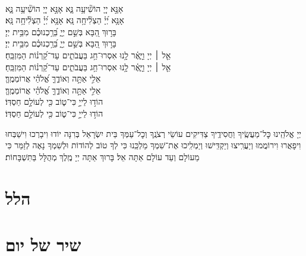 \documentclass[twoside, openany, parskip=half, 11pt]{book}
\begin{document}
{\\
אָנָּ֣א יְיָ֭ הוֹשִׁ֘יעָ֥ה נָּ֑א \hfill אָנָּ֣א יְיָ֭ הוֹשִׁ֘יעָ֥ה נָּ֑א\\
אָנָּ֥א יְ֝יָ֗ הַצְלִ֘יחָ֥ה נָּֽא׃ \hfill אָנָּ֥א יְ֝יָ֗ הַצְלִ֘יחָ֥ה נָּֽא׃\\
בָּר֣וּךְ הַ֭בָּא בְּשֵׁ֣ם יְיָ֑ בֵּ֝רַ֥כְנוּכֶ֗ם מִבֵּ֥ית יְיָ׃\\
\scriptsize{בָּר֣וּךְ הַ֭בָּא בְּשֵׁ֣ם יְיָ֑ בֵּ֝רַ֥כְנוּכֶ֗ם מִבֵּ֥ית יְיָ׃}\\
\normalsize{אֵ֤ל ׀ יְיָ וַיָּ֢אֶ֫ר לָ֥נוּ אִסְרוּ־חַ֥ג בַּעֲבֹתִ֑ים עַד־קַ֝רְנ֗וֹת הַמִּזְבֵּֽחַ׃}\\
\scriptsize{אֵ֤ל ׀ יְיָ וַיָּ֢אֶ֫ר לָ֥נוּ אִסְרוּ־חַ֥ג בַּעֲבֹתִ֑ים עַד־קַ֝רְנ֗וֹת הַמִּזְבֵּֽחַ׃}\\
\normalsize{אֵלִ֣י אַתָּ֣ה וְאוֹדֶ֑ךָּ אֱ֝לֹהַ֗י אֲרוֹמְמֶֽךָּ׃}\\
\scriptsize{אֵלִ֣י אַתָּ֣ה וְאוֹדֶ֑ךָּ אֱ֝לֹהַ֗י אֲרוֹמְמֶֽךָּ׃}\\
\normalsize{הוֹד֣וּ לַייָ֣ כִּי־ט֑וֹב כִּ֖י לְעוֹלָ֣ם חַסְדּֽוֹ׃}\\
\scriptsize{הוֹד֣וּ לַייָ֣ כִּי־ט֑וֹב כִּ֖י לְעוֹלָ֣ם חַסְדּֽוֹ׃} \\
\normalsize{}



\negline

יְיָ אֱלֹהֵֽינוּ כׇּל־מַעֲשֶֽׂיךָ וַחֲסִידֶֽיךָ צַדִּיקִים עוֹשֵׂי רְצֹנֶֽךָ וְכׇל־עַמְּךָ בֵּית יִשְׂרָאֵל בְּרִנָּה יוֹדוּ וִיבָרְכוּ וִישַׁבְּחוּ וִיפָאֲרוּ וִירוֹמֲמוּ וְיַעֲרִֽיצוּ וְיַקְדִּֽישׁוּ וְיַמְלִֽיכוּ אֶת־שִׁמְךָ מַלְכֵּֽנוּ כִּי לְךָ טוֹב לְהוֹדוֹת וּלְשִׁמְךָ נָאֶה לְזַמֵּר כִּי מֵעוֹלָם וְעַד עוֹלָם אַתָּה אֵל׃ בָּרוּךְ אַתָּה יְיָ מֶֽלֶךְ מְהֻלָּל בַּתִּשְׁבָּחוֹת׃
}

\label{hallel}
\section[הלל‎]{ הלל‎ }
\hallel{\shatz}


\vfill
\label{shacharitShabbatYTtitkabel}
\fullkaddish
\section[שיר של יום]{ שיר של יום‎ }
\weekdayshir

\end{document}
